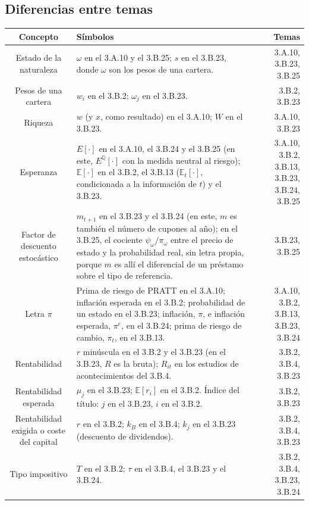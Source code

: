 \documentclass[10pt,a4paper]{article}
\begin{document}
\subsection*{Diferencias entre temas}
\begin{longtable}{SMD}
\toprule\textbf{Concepto} & \textbf{Símbolos} & \textbf{Temas}\\\midrule\endhead\bottomrule\endfoot
Estado de la naturaleza & $\omega$ en el 3.A.10 y el 3.B.25; $s$ en el 3.B.23, donde $\omega$ son los pesos de una cartera. & 3.A.10, 3.B.23, 3.B.25\\
Pesos de una cartera & $w_i$ en el 3.B.2; $\omega_j$ en el 3.B.23. & 3.B.2, 3.B.23\\
Riqueza & $w$ (y $x$, como resultado) en el 3.A.10; $W$ en el 3.B.23. & 3.A.10, 3.B.23\\
Esperanza & $E[\cdot]$ en el 3.A.10, el 3.B.24 y el 3.B.25 (en este, $E^{\mathbb{Q}}[\cdot]$ con la medida neutral al riesgo); $\mathbb E[\cdot]$ en el 3.B.2, el 3.B.13 ($\mathbb{E}_t[\cdot]$, condicionada a la información de $t$) y el 3.B.23. & 3.A.10, 3.B.2, 3.B.13, 3.B.23, 3.B.24, 3.B.25\\
Factor de descuento estocástico & $m_{t+1}$ en el 3.B.23 y el 3.B.24 (en este, $m$ es también el número de cupones al año); en el 3.B.25, el cociente $\psi_\omega/\pi_\omega$ entre el precio de estado y la probabilidad real, sin letra propia, porque $m$ es allí el diferencial de un préstamo sobre el tipo de referencia. & 3.B.23, 3.B.25\\
Letra $\pi$ & Prima de riesgo de PRATT en el 3.A.10; inflación esperada en el 3.B.2; probabilidad de un estado en el 3.B.23; inflación, $\pi$, e inflación esperada, $\pi^e$, en el 3.B.24; prima de riesgo de cambio, $\pi_t$, en el 3.B.13. & 3.A.10, 3.B.2, 3.B.13, 3.B.23, 3.B.24\\
Rentabilidad & $r$ minúscula en el 3.B.2 y el 3.B.23 (en el 3.B.23, $R$ es la bruta); $R_{it}$ en los estudios de acontecimientos del 3.B.4. & 3.B.2, 3.B.4, 3.B.23\\
Rentabilidad esperada & $\mu_j$ en el 3.B.23; $\mathbb E[r_i]$ en el 3.B.2. Índice del título: $j$ en el 3.B.23, $i$ en el 3.B.2. & 3.B.2, 3.B.23\\
Rentabilidad exigida o coste del capital & $r$ en el 3.B.2; $k_B$ en el 3.B.4; $k_j$ en el 3.B.23 (descuento de dividendos). & 3.B.2, 3.B.4, 3.B.23\\
Tipo impositivo & $T$ en el 3.B.2; $\tau$ en el 3.B.4, el 3.B.23 y el 3.B.24. & 3.B.2, 3.B.4, 3.B.23, 3.B.24\\

\end{longtable}
\end{document}
